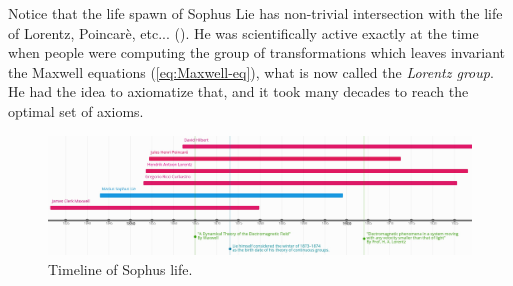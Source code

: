 \documentclass[../main.tex]{subfiles}
\begin{document}
\newline
\newline
Notice that the life spawn of Sophus Lie has non-trivial intersection with the life of Lorentz, Poincarè, etc... (). He was scientifically active exactly at the time when people were computing the group of transformations which leaves invariant the Maxwell equations (\ref{eq:Maxwell-eq}), what is now called the \textit{Lorentz group}. He had the idea to axiomatize that, and it took many decades to reach the optimal set of axioms.\\
\begin{figure}[h!]
	\includegraphics{images/Sophus_timeline.jpg}
	\caption{Timeline of Sophus life.}
\end{figure}
\end{document}
